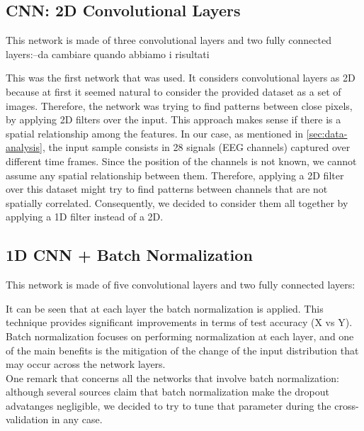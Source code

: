 \documentclass[10pt,conference,compsocconf]{IEEEtran}
\begin{document}
\subsection{CNN: 2D Convolutional Layers}
This network is made of three convolutional layers and two fully connected layers:--da cambiare quando abbiamo i risultati


This was the first network that was used. It considers convolutional layers as 2D because at first it seemed natural to consider the provided dataset as a set of images. Therefore, the network was trying to find patterns between close pixels, by applying 2D filters over the input. This approach makes sense if there is a spatial relationship among the features. In our case, as mentioned in \ref{sec:data-analysis}, the input sample consists in 28 signals (EEG channels) captured over different time frames. Since the position of the channels is not known, we cannot assume any spatial relationship between them. Therefore, applying a 2D filter over this dataset might try to find patterns between channels that are not spatially correlated. Consequently, we decided to consider them all together by applying a 1D filter instead of a 2D. 


\subsection{1D CNN + Batch Normalization}
This network is made of five convolutional layers and two fully connected layers:

It can be seen that at each layer the batch normalization is applied. This technique provides significant improvements in terms of test accuracy (X vs Y). Batch normalization focuses on performing normalization at each layer, and one of the main benefits is the mitigation of the change of the input distribution that may occur across the network layers. \\%
One remark that concerns all the networks that involve batch normalization: although several sources claim that batch normalization make the dropout advatanges negligible, we decided to try to tune that parameter during the cross-validation in any case.
\end{document}
